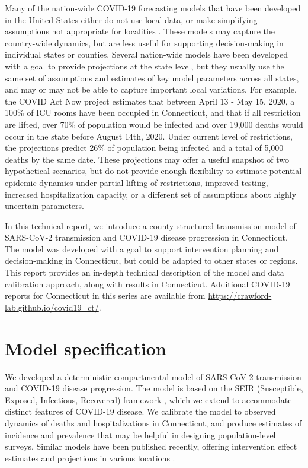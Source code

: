\documentclass[11pt]{article}
\begin{document}
Many of the nation-wide COVID-19 forecasting models that have been developed in the United States either do not use local data, or make simplifying assumptions not appropriate for localities \citep{cdc2020covid19forecasts}. These models may capture the country-wide dynamics, but are less useful for supporting decision-making in individual states or counties. Several nation-wide models have been developed with a goal to provide projections at the state level, but they usually use the same set of assumptions and estimates of key model parameters across all states, and may or may not be able to capture important local variations. For example, the COVID Act Now project \citep{covidactnow2020you} estimates that between April 13 - May 15, 2020, a 100\% of ICU rooms have been occupied in Connecticut, and that if all restriction are lifted, over 70\% of population would be infected and over 19,000 deaths would occur in the state before August 14th, 2020. Under current level of restrictions, the projections predict 26\% of population being infected and a total of 5,000 deaths by the same date. These projections may offer a useful snapshot of two hypothetical scenarios, but do not provide enough flexibility to estimate potential epidemic dynamics under partial lifting of restrictions, improved testing, increased hospitalization capacity, or a different set of assumptions about highly uncertain parameters.  

In this technical report, we introduce a county-structured transmission model of SARS-CoV-2 transmission and COVID-19 disease progression in Connecticut.  The model was developed with a goal to support intervention planning and decision-making in Connecticut, but could be adapted to other states or regions.  This report provides an in-depth technical description of the model and data calibration approach, along with results in Connecticut.  Additional COVID-19 reports for Connecticut in this series are available from \url{https://crawford-lab.github.io/covid19_ct/}. 


\section{Model specification}

We developed a deterministic compartmental model of SARS-CoV-2 transmission and COVID-19 disease progression.
The model is based on the SEIR (Susceptible, Exposed, Infectious, Recovered) framework \citep{keeling2011modeling}, which we extend to accommodate distinct features of COVID-19 disease. We calibrate the model to observed dynamics of deaths and hospitalizations in Connecticut, and produce estimates of incidence and prevalence that may be helpful in designing population-level surveys. Similar models have been published recently, offering intervention effect estimates and projections in various locations \citep{cdc2020covid19forecasts, li2020substantial, kissler2020projecting, childs2020impact, salje2020estimating, salomon2020defining}.
\end{document}
